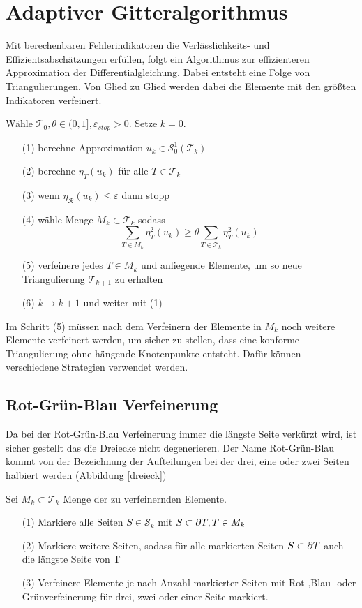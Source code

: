 \chapter{Adaptiver Gitteralgorithmus}
Mit berechenbaren Fehlerindikatoren die Verlässlichkeits- und Effizientsabschätzungen erfüllen, folgt ein Algorithmus zur effizienteren Approximation der Differentialgleichung. Dabei entsteht eine Folge von Triangulierungen. Von Glied zu Glied werden dabei die Elemente mit den größten Indikatoren verfeinert.
\begin{algorithmus}
	Wähle $\mathscr{T}_0, \theta\in (0,1],\varepsilon_{stop}>0$. Setze $k=0$.
	\begin{itemize}
		\item[(1)] berechne Approximation $u_k\in\mathscr{S}_0^1(\mathscr{T}_k)$
		\item[(2)] berechne $\eta_T(u_k)$ für alle $T\in\mathscr{T}_k$
		\item[(3)] wenn $\eta_{\mathscr{R}}(u_k) \leq \varepsilon$ dann stopp
		\item[(4)] wähle Menge $M_k\subset\mathscr{T}_k$ sodass
		\[ \sum_{T\in M_k} \eta_T^2(u_k) \geq \theta\sum_{T\in\mathscr{T}_k}\eta_T^2(u_k)\]
		\item[(5)] verfeinere jedes $T\in M_k$ und anliegende Elemente, um so neue Triangulierung $\mathscr{T}_{k+1}$ zu erhalten
		\item[(6)] $k \rightarrow k + 1$ und weiter mit (1)
	\end{itemize}
\end{algorithmus}
Im Schritt (5) müssen nach dem Verfeinern der Elemente in $M_k$ noch weitere Elemente verfeinert werden, um sicher zu stellen, dass eine konforme Triangulierung ohne hängende Knotenpunkte entsteht. Dafür können verschiedene Strategien verwendet werden.

\section{Rot-Grün-Blau Verfeinerung}
Da bei der Rot-Grün-Blau Verfeinerung immer die längste Seite verkürzt wird, ist sicher gestellt das die Dreiecke nicht degenerieren. Der Name Rot-Grün-Blau kommt von der Bezeichnung der Aufteilungen bei der drei, eine oder zwei Seiten halbiert werden (Abbildung \ref{dreieck})
\newpage
\begin{algorithmus}
    Sei $M_k\subset \mathscr{T}_k$ Menge der zu verfeinernden Elemente.
	\begin{itemize}
		\item[(1)] Markiere alle Seiten $S \in \mathscr{S}_k$ mit $S \subset \partial T, T\in M_k$
		\item[(2)] Markiere weitere Seiten, sodass für alle markierten Seiten $S\subset \partial T$  auch die längste Seite von T
		\item[(3)] Verfeinere Elemente je nach Anzahl markierter Seiten mit  Rot-,Blau- oder Grünverfeinerung für drei, zwei oder einer Seite markiert.
	\end{itemize}
\end{algorithmus} 

